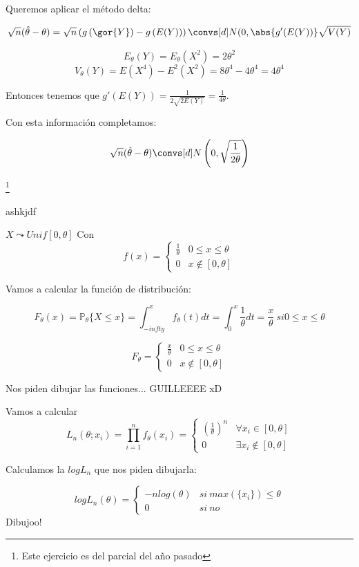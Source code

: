 \begin{problem}[5]
Queremos aplicar el método delta:

\[\sqrt{n}(\hat{\theta} - \theta) = \sqrt{n}\left(g\left(\gor{Y}\right) - g\left(E(Y)\right)\right) \convs[d]N(0,\abs{g'(E(Y))}\sqrt{V(Y)}\]

\[E_{\theta}(Y) = E_{\theta} (X^2) = 2\theta^2\]
\[V_{\theta}(Y) = E(X^4) - E^2(X^2) = 8\theta^4-4\theta^4 = 4\theta^4\]

Entonces tenemos que $g'(E(Y)) = \displaystyle \frac{1}{2\sqrt{2E(Y)}} = \frac{1}{4\theta}$.

Con esta información completamos:  

\[\sqrt{n}(\hat{\theta} - \theta) \convs[d] N\left(0,\sqrt{\frac{1}{2\theta}}\right)\]

\end{problem}

\begin{problem}[11]
\footnote{Este ejercicio es del parcial del año pasado}

ashkjdf
\solution

$X\leadsto Unif[0,\theta]$
Con \[ f(x) = \displaystyle\left\{\begin{array}{cc}
\frac{1}{\theta} & 0\leq x \leq \theta\\
0 & x \notin [0,\theta]
\end{array}\right.\]

Vamos a calcular la función de distribución:

\[F_{\theta} (x) = \mathbb{P}_{\theta}\{X\leq x\} = \int_{-infty}^x f_{\theta}(t)dt = \int_0^x \frac{1}{\theta} dt = \frac{x}{\theta} \ si 0\leq x \leq \theta\]

\[F_{\theta} = \left\{\begin{array}{cc}
\frac{x}{\theta} & 0\leq x \leq \theta\\
0 & x \notin [0,\theta]
\end{array}\right.\]

Nos piden dibujar las funciones... GUILLEEEE xD

Vamos a calcular \[L_n(\theta;x_i) = \prod_{i=1}^n f_{\theta} (x_i) = \left\{\begin{array}{cc}
\left(\frac{1}{\theta}\right)^n & \forall x_i \in [0,\theta]\\
0 & \exists x_i\notin [0,\theta]
\end{array}\right.\]

Calculamos la $logL_n$ que nos piden dibujarla:

\[logL_n(\theta) = \left\{\begin{array}{cc}
-nlog(\theta) & si \ max(\{x_i\})\leq \theta\\
0 & si \ no
\end{array}\right.\]
Dibujoo!


\end{problem}
